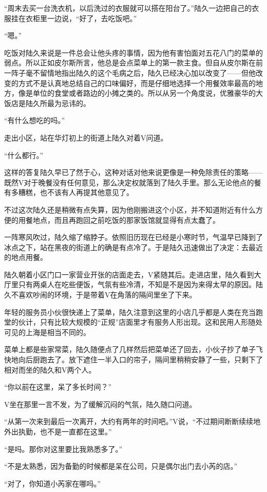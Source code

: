 “周末去买一台洗衣机，以后洗过的衣服就可以搭在阳台了。”陆久一边把自己的衣服挂在衣柜里一边说，“好了，去吃饭吧。”

“嗯。”

吃饭对陆久来说是一件总会让他头疼的事情，因为他有害怕面对五花八门的菜单的弱点。所以正如皮尔斯所言，他总是会点菜单上的第一款主食。但自从皮尔斯在前一阵子毫不留情地指出陆久的这个毛病之后，陆久已经决心加以改变了——但他改变的方式不是认真地总结自己的口味偏好，而是仔细地选择一个用餐效率最高的地方，像是单位的食堂或者路边的小摊之类的。所以从另一个角度说，优雅豪华的大饭店是陆久所最为忌讳的。

“有什么想吃的吗。”

走出小区，站在华灯初上的街道上陆久对着V问道。

“什么都行。”

这样的答复陆久早已了然于心，这种对话对他来说更像是一种免除责任的策略——既然V对于晚餐没有任何意见，那么决定权就落到了陆久手里。那么无论他点的餐有多糟糕，也不该有人再提其他意见了。

不过这次陆久还是稍微有点失算，因为他刚搬进这个小区，并不知道附近有什么方便的用餐地点，而且再跑回之前吃饭的那家饭馆就显得有点太蠢了。

一阵寒风吹过，陆久缩了缩脖子。依照旧历现在已经是小寒时节，气温早已降到了冰点之下，站在黑夜的街道上的确是有点冷了。于是陆久迅速做出了决定：去最近的地点用餐。

陆久朝着小区门口一家营业开张的店面走去，V紧随其后。走进店里，陆久看到大厅里只有两桌人在吃些便饭，气氛有些冷清，不知是不是因为来得太早的原因。陆久不喜欢吵闹的环境，于是带着V在角落的隔间里坐了下来。

年轻的服务员小伙很快递上了菜单，陆久注意到这里的小店几乎都是人类在充当跑堂的伙计，只有比较大规模的“正规”店面里才有服务人形出现。这和民用人形随处可见的上海是相当不同的。

菜单上都是些家常菜，陆久随便点了几样然后把菜单还了回去，小伙子抄了单子飞快地向后厨跑去了。放下遮住一半入口的帘子，隔间里稍稍安静了一些，只剩下了相对而坐的陆久和V两个人。

“你以前在这里，呆了多长时间？”

V坐在那里一言不发，为了缓解沉闷的气氛，陆久随口问道。

“从第一次来到最后一次离开，大约有两年的时间吧。”V说，“不过期间断断续续地外出执勤，也不是一直都在这里。”

“是吗。那你对这里要比我熟悉多了。”

“不是太熟悉，因为备勤的时候都是呆在公司，只是偶尔出门去小芮的店。”

“对了，你知道小芮家在哪吗。”

